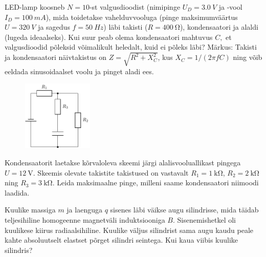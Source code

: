 \documentclass[10pt]{article}
\begin{document}
LED-lamp koosneb $N=10$-st valgusdioodist (nimipinge $U_{D}=\SI{3.0}{V}$ ja -vool $I_{D}=\SI{100}{mA}$), mida toidetakse vahelduvvooluga (pinge maksimumväärtus $U=\SI{320}{V}$ ja sagedus $f=\SI{50}{Hz}$) läbi takisti ($R=\SI{400}{\ohm}$), kondensaatori ja alaldi (lugeda ideaalseks). Kui suur peab olema kondensaatori mahtuvus $C,$ et valgusdioodid põleksid võimalikult heledalt, kuid ei põleks läbi? Märkus: Takisti ja kondensaatori näivtakistus on $Z=\sqrt{R^{2}+X_{C}^{2}}$, kus $X_{C}=1/\left(2\pi fC\right)$ ning võib eeldada sinusoidaalset voolu ja pinget aladi ees.
\probend
\bigskip

\setAuthor{}

\begin{figure}
\vspace{-45pt}
	\begin{center}
		\includegraphics[width = 0.30\textwidth]{2019-v2g-06-yl.pdf}
	\end{center}
\end{figure}


Kondensaatorit laetakse kõrvaloleva skeemi järgi alalisvooluallikast pingega $U=\SI{12}{\V}$. Skeemis olevate takistite takistused on vastavalt $R_1=\SI{1}{\kilo\ohm}$, $R_2=\SI{2}{\kilo\ohm}$ ning $R_3=\SI{3}{\kilo\ohm}$. Leida maksimaalne pinge, milleni saame kondensaatori niimoodi laadida. 
\vspace{10pt}
\probend
\bigskip

\setAuthor{}

Kuulike massiga $m$ ja laenguga $q$ sisenes läbi väikse augu silindrisse, mida täidab teljesihiline homogeenne magnetväli induktsiooniga $B$. Sisenemishetkel oli kuulikese kiirus radiaalsihiline. Kuulike väljus silindrist sama augu kaudu peale kahte absoluutselt elastset põrget silindri seintega. Kui kaua viibis kuulike silindris? 
\vspace{-5pt}
\probend
\bigskip
\end{document}
